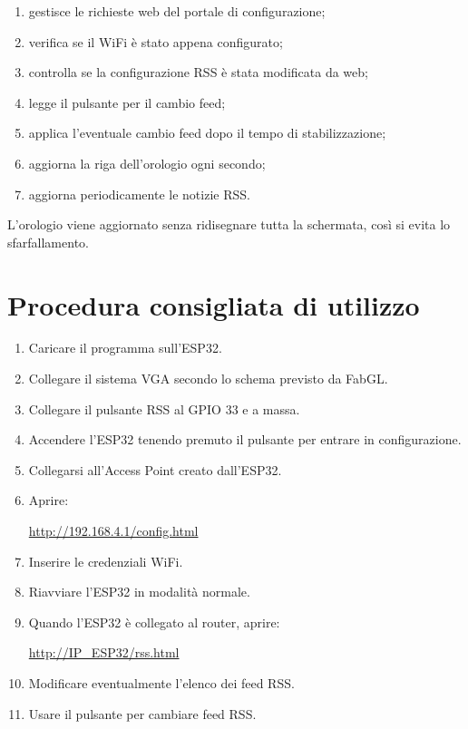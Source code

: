 \documentclass[11pt,a4paper]{article}
\begin{document}
	\begin{enumerate}
		\item gestisce le richieste web del portale di configurazione;
		\item verifica se il WiFi è stato appena configurato;
		\item controlla se la configurazione RSS è stata modificata da web;
		\item legge il pulsante per il cambio feed;
		\item applica l'eventuale cambio feed dopo il tempo di stabilizzazione;
		\item aggiorna la riga dell'orologio ogni secondo;
		\item aggiorna periodicamente le notizie RSS.
	\end{enumerate}
	
	L'orologio viene aggiornato senza ridisegnare tutta la schermata, così si evita lo sfarfallamento.
	
	\section{Procedura consigliata di utilizzo}
	
	\begin{enumerate}
		\item Caricare il programma sull'ESP32.
		\item Collegare il sistema VGA secondo lo schema previsto da FabGL.
		\item Collegare il pulsante RSS al GPIO 33 e a massa.
		\item Accendere l'ESP32 tenendo premuto il pulsante per entrare in configurazione.
		\item Collegarsi all'Access Point creato dall'ESP32.
		\item Aprire:
		\begin{center}
			\url{http://192.168.4.1/config.html}
		\end{center}
		\item Inserire le credenziali WiFi.
		\item Riavviare l'ESP32 in modalità normale.
		\item Quando l'ESP32 è collegato al router, aprire:
		\begin{center}
			\url{http://IP_ESP32/rss.html}
		\end{center}
		\item Modificare eventualmente l'elenco dei feed RSS.
		\item Usare il pulsante per cambiare feed RSS.
	\end{enumerate}
	
\end{document}

